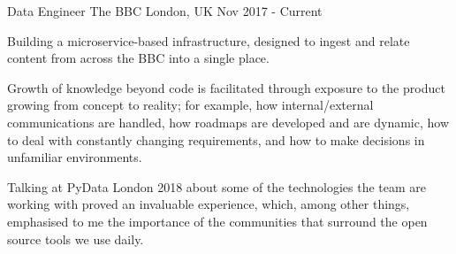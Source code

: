 \begin{cventries}
    
    \cventry
        {Data Engineer}
        {The BBC}
        {London, UK}
        {Nov 2017 - Current}

        {
            \begin{cvitems}
            
                \item{Building a microservice-based infrastructure, designed to ingest and relate content from across the BBC into a single place.}
                \item{Growth of knowledge beyond code is facilitated through exposure to the product growing from concept to reality; for example, how internal/external communications are handled, how roadmaps are developed and are dynamic, how to deal with constantly changing requirements, and how to make decisions in unfamiliar environments.}
                \item{Talking at PyData London 2018 about some of the technologies the team are working with proved an invaluable experience, which, among other things, emphasised to me the importance of the communities that surround the open source tools we use daily.}
            
            \end{cvitems}
        }

\end{cventries}